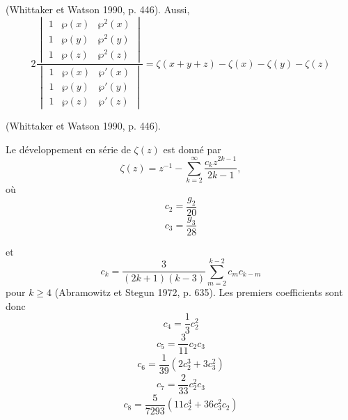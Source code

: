 \documentclass[12pt]{article}
\begin{document}
                        (Whittaker et Watson 1990, p. 446). Aussi,
                        \[
                            2 \frac{\begin{vmatrix}
                                1 & \wp (x) & \wp^2 (x) \\
                                1 & \wp (y) & \wp^2 (y) \\
                                1 & \wp (z) & \wp^2 (z)
                                \end{vmatrix}}{\begin{vmatrix}
                                    1 & \wp (x) & \wp' (x) \\
                                    1 & \wp (y) & \wp' (y) \\
                                    1 & \wp (z) & \wp' (z)
                                    \end{vmatrix} }               
                        = \zeta (x + y + z) - \zeta (x) - \zeta (y) - \zeta (z) \tag{12}
                        \]
                        
                        (Whittaker et Watson 1990, p. 446).
                        
                        Le développement en série de $\zeta (z)$ est donné par
                        \[
                        \zeta (z) = z^{-1} - \sum_{k=2}^{\infty} \frac{c_k z^{2k-1}}{2k-1}, \tag{13}
                        \]
                        où
                        \[
                        c_2 = \frac{g_2}{20} \tag{14}
                        \]
                        \[
                        c_3 = \frac{g_3}{28} \tag{15}
                        \]
                        
                        et
                        \[
                        c_k = \frac{3}{(2k + 1)(k - 3)} \sum_{m=2}^{k-2} c_m c_{k-m} \tag{16}
                        \]
                        pour $k \geq 4$ (Abramowitz et Stegun 1972, p. 635). Les premiers coefficients sont donc
                        \[
                        c_4 = \frac{1}{3} c_2^2 \tag{17}
                        \]
                        \[
                        c_5 = \frac{3}{11} c_2 c_3 \tag{18}
                        \]
                        \[
                        c_6 = \frac{1}{39} \left( 2 c_2^3 + 3 c_3^2 \right) \tag{19}
                        \]
                        \[
                        c_7 = \frac{2}{33} c_2^2 c_3 \tag{20}
                        \]
                        \[
                        c_8 = \frac{5}{7293} \left( 11 c_2^4 + 36 c_3^2 c_2 \right) \tag{21}
                        \]
\end{document}
